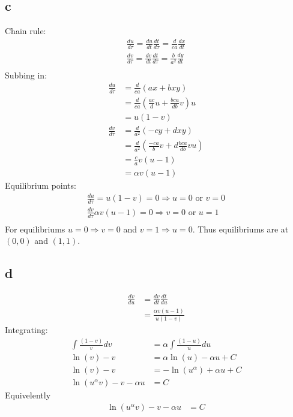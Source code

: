 \documentclass{unswmaths}
\begin{document}
\subsection*{c}
    Chain rule:
    \begin{align*}
        \frac{du}{d\tau} = \frac{du}{dt} \frac{dt}{d\tau} = \frac{d}{ca}\frac{dx}{dt} \\
        \frac{dv}{d\tau} = \frac{dv}{dt} \frac{dt}{d\tau} = \frac{b}{a^2} \frac{dy}{dt} \\
    \end{align*}
    Subbing in:
    \begin{align*}
        \frac{du}{d\tau} &= \frac{d}{ca} \left( ax + bxy \right) \\
            &= \frac{d}{ca} \left( \frac{ac}{d} u + \frac{bca}{db} v\right)u \\
            &= u(1-v) \\
        \frac{dv}{d\tau} &= \frac{d}{a^2} \left( -cy + dxy \right) \\
            &= \frac{d}{a^2} \left( \frac{-ca}{b} v + d\frac{bca}{db} vu\right) \\
            &= \frac{c}{a} v\left(u - 1\right) \\
            &= \alpha v(u - 1)
    \end{align*}
    Equilibrium points:
    \begin{align*}
        \frac{du}{d\tau} = u(1-v) = 0 \Longrightarrow  u = 0 \text{ or } v = 0 \\
        \frac{dv}{d\tau} \alpha v(u-1) = 0 \Longrightarrow v = 0 \text{ or } u = 1 \\
    \end{align*}
    For equilibriums $ u = 0 \Longrightarrow v = 0 $ and $ v = 1 \Longrightarrow u = 0 $.
    Thus equilibriums are at $ (0,0) $ and $ (1,1) $.
\subsection*{d}
    \begin{align*}
        \frac{dv}{du} &= \frac{dv}{dt} \frac{dt}{du} \\
            &= \frac{\alpha v(u-1)}{u(1-v)}
    \end{align*}
    Integrating:
    \begin{align*}
        \int \frac{(1-v)}{v}dv &= \alpha \int \frac{(1-u)}{u} du \\
        \ln(v) - v &= \alpha \ln(u) - \alpha u + C \\
        \ln(v) - v &= -\ln(u^\alpha) + \alpha u  + C \\
        \ln(u^\alpha v) - v -\alpha u &= C
    \end{align*}
    Equivelently
    \begin{align*}
        \ln(u^\alpha v) - v -\alpha u &= C
    \end{align*}
\end{document}
